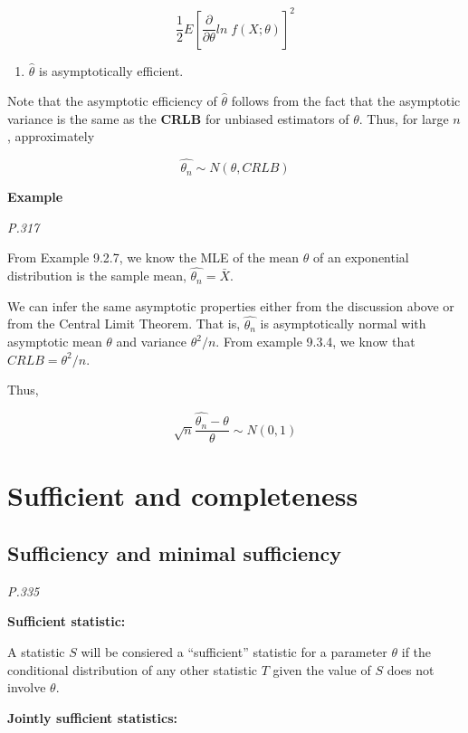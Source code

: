 \documentclass[]{book}
\providecommand{\tightlist}{%
  \setlength{\itemsep}{0pt}\setlength{\parskip}{0pt}}
\begin{document}
\[\frac{1}{2}E[\frac{\partial}{\partial\theta}ln \; f(X;\theta)]^2\]

\begin{enumerate}
\def\labelenumi{(\arabic{enumi})}
\setcounter{enumi}{3}
\tightlist
\item
  \(\hat{\theta}\) is asymptotically efficient.
\end{enumerate}

Note that the asymptotic efficiency of \(\hat{\theta}\) follows from the fact that the asymptotic variance is the same as the \textbf{CRLB} for unbiased estimators of \(\theta\). Thus, for large \(n\), approximately

\[\hat{\theta_n} \sim N(\theta, CRLB)\]

\textbf{Example}

\emph{P.317}

From Example 9.2.7, we know the MLE of the mean \(\theta\) of an exponential distribution is the sample mean, \(\hat{\theta_n}=\bar{X}\).

We can infer the same asymptotic properties either from the discussion above or from the Central Limit Theorem. That is, \(\hat{\theta_n}\) is asymptotically normal with asymptotic mean \(\theta\) and variance \(\theta^2/n\). From example 9.3.4, we know that \(CRLB=\theta^2/n\).

Thus,

\[\sqrt{n}\frac{\hat{\theta_n}-\theta}{\theta}\sim N(0,1)\]

\hypertarget{sufficient-and-completeness}{%
\section{Sufficient and completeness}\label{sufficient-and-completeness}}

\hypertarget{sufficiency-and-minimal-sufficiency}{%
\subsection{Sufficiency and minimal sufficiency}\label{sufficiency-and-minimal-sufficiency}}

\emph{P.335}

\textbf{Sufficient statistic:}

A statistic \(S\) will be consiered a ``sufficient'' statistic for a parameter \(\theta\) if the conditional distribution of any other statistic \(T\) given the value of \(S\) does not involve \(\theta\).

\textbf{Jointly sufficient statistics:}
\end{document}
